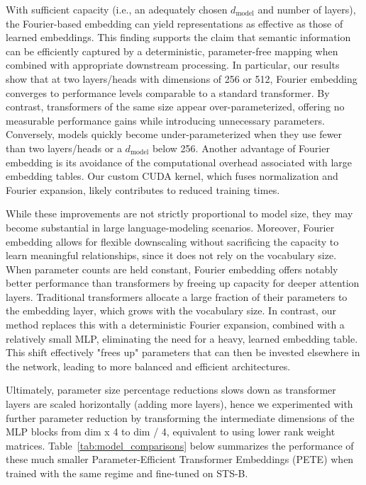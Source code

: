 \documentclass{article}
\begin{document}
With sufficient capacity (i.e., an adequately chosen \(d_{\text{model}}\) and number of layers), the Fourier-based embedding can yield representations as effective as those of learned embeddings. This finding supports the claim that semantic information can be efficiently captured by a deterministic, parameter-free mapping when combined with appropriate downstream processing. In particular, our results show that at two layers/heads with dimensions of 256 or 512, Fourier embedding converges to performance levels comparable to a standard transformer. By contrast, transformers of the same size appear over-parameterized, offering no measurable performance gains while introducing unnecessary parameters. Conversely, models quickly become under-parameterized when they use fewer than two layers/heads or a \(d_{\text{model}}\) below 256. Another advantage of Fourier embedding is its avoidance of the computational overhead associated with large embedding tables. Our custom CUDA kernel, which fuses normalization and Fourier expansion, likely contributes to reduced training times. 

While these improvements are not strictly proportional to model size, they may become substantial in large language-modeling scenarios. Moreover, Fourier embedding allows for flexible downscaling without sacrificing the capacity to learn meaningful relationships, since it does not rely on the vocabulary size. When parameter counts are held constant, Fourier embedding offers notably better performance than transformers by freeing up capacity for deeper attention layers. Traditional transformers allocate a large fraction of their parameters to the embedding layer, which grows with the vocabulary size. In contrast, our method replaces this with a deterministic Fourier expansion, combined with a relatively small MLP, eliminating the need for a heavy, learned embedding table. This shift effectively "frees up" parameters that can then be invested elsewhere in the network, leading to more balanced and efficient architectures.

Ultimately, parameter size percentage reductions slows down as transformer layers are scaled horizontally (adding more layers), hence we experimented with further parameter reduction by transforming the intermediate dimensions of the MLP blocks from dim x 4 to dim / 4, equivalent to using lower rank weight matrices. Table~\ref{tab:model_comparisons} below summarizes the performance of these much smaller Parameter-Efficient Transformer Embeddings (PETE) when trained with the same regime and fine-tuned on STS-B.
\end{document}

